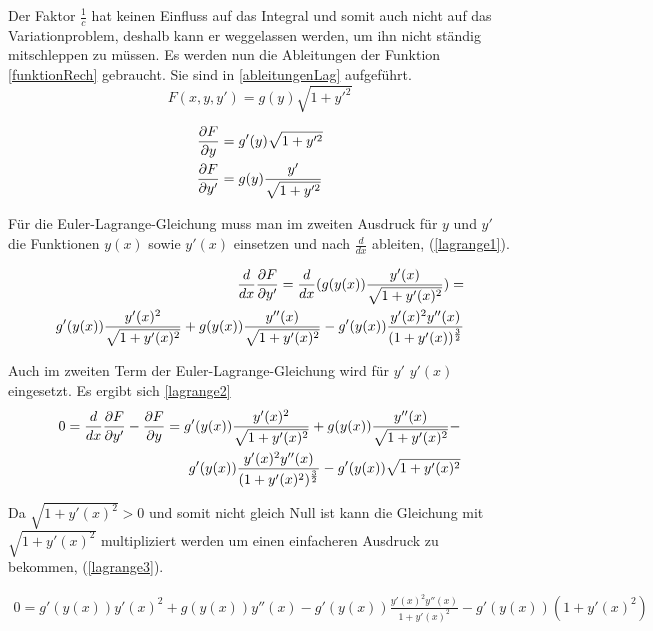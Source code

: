 Der Faktor $\frac{1}{c}$ hat keinen Einfluss auf das Integral und somit auch nicht auf das Variationproblem, deshalb kann er weggelassen werden, um ihn nicht ständig mitschleppen zu müssen.
Es werden nun die Ableitungen der Funktion \ref{funktionRech} gebraucht. Sie sind in \ref{ableitungenLag} aufgeführt.
\begin{equation}
	F(x,y,y') = g(y) \sqrt{1 + y'^2}
	\label{funktionRech}
\end{equation}

\begin{align}
	\frac{\partial F}{\partial y} &= g'(y) \sqrt{1 + y'^2} \notag \\
	\frac{\partial F}{\partial y'} &= g(y) \frac{y'}{\sqrt{1 + y'^2}}
	\label{ableitungenLag}
\end{align}

Für die Euler-Lagrange-Gleichung muss man im zweiten Ausdruck für $y$ und $y'$ die Funktionen $y(x)$ 
sowie $y'(x)$ einsetzen und nach $\frac{d}{dx}$ ableiten, (\eqref{lagrange1}).

\begin{align}
	\frac{d}{dx} \frac{\partial F}{\partial y'} = \frac{d}{dx} (g(y(x)) \frac{y'(x)}{\sqrt{1 + y'(x)^2}}) =
	 \notag \\ g'(y(x)) \frac{y'(x)^2}{\sqrt{1 + y'(x)^2}} + g(y(x)) \frac{y''(x)}{\sqrt{1 + y'(x)^2}} -
	 g'(y(x)) \frac{y'(x)^2 y''(x)}{(1 + y'(x))^\frac{3}{2}} 
	 \label{lagrange1}
\end{align}

Auch im zweiten Term der Euler-Lagrange-Gleichung wird für $y'$ $y'(x)$ eingesetzt. Es ergibt sich \eqref{lagrange2}
\begin{align}
	0 = \frac{d}{dx} \frac{\partial F}{\partial y'} - \frac{\partial F}{\partial y} = 
	g'(y(x)) \frac{y'(x)^2}{\sqrt{1 + y'(x)^2}} + g(y(x)) \frac{y''(x)}{\sqrt{1 + y'(x)^2}} - \notag \\
	g'(y(x)) \frac{y'(x)^2 y''(x)}{(1 + y'(x)^2)^\frac{3}{2}}  - g'(y(x)) \sqrt{1 + y'(x)^2}
	\label{lagrange2}
\end{align}

Da $\sqrt{1 + y'(x)^2} > 0$ und somit nicht gleich Null ist kann die Gleichung mit $\sqrt{1 + y'(x)^2}$  multipliziert werden um einen einfacheren Ausdruck zu bekommen, (\eqref{lagrange3}).

\begin{align}
	0 = g'(y(x)) y'(x)^2 + g(y(x)) y''(x) - g'(y(x)) \frac{y'(x)^2 y''(x)}{1 + y'(x)^2} - g'(y(x)) (1 + y'(x)^2)
	\label{lagrange3}
\end{align}

